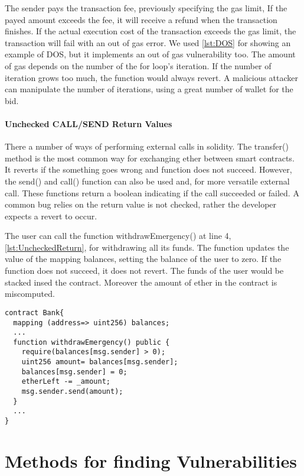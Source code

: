 \documentclass[a4paper,sigconf, language=french,
language=german, language=spanish, language=english]{acmart}
\begin{document}
The sender pays the transaction fee, previously specifying the gas limit, If the payed amount exceeds the fee, it will receive a refund when the transaction finishes. 
If the actual execution cost of the transaction exceeds the gas limit, the transaction will fail with an out of gas error. 
We used \autoref{lst:DOS} for showing an example of DOS, but it implements an out of gas vulnerability too. 
The amount of gas depends on the number of the for loop's iteration. If the number of iteration grows too much, the function would always revert. A malicious attacker can 
manipulate the number of iterations, using a great number of wallet for the bid.

\paragraph{Unchecked CALL/SEND Return Values} There a number of ways of performing external calls in solidity. The transfer() method is the most common way for exchanging ether between smart contracts. 
It reverts if the something goes wrong and function does not succeed. However, the send() and call() function can also be used and, for more versatile external call. 
These functions return a boolean indicating if the call succeeded or failed.  A common bug relies on the return value is not checked, rather the developer expects a revert to occur. 

The user can call the function withdrawEmergency()  at line 4, \autoref{lst:UncheckedReturn}, for withdrawing all its funds. The function updates the value of the mapping balances, setting 
the balance of the user to zero. If the function does not succeed, it does not revert. 
The funds of the user would be stacked insed the contract. Moreover the amount of ether in the contract is miscomputed.


\begin{lstlisting}[language=Solidity,caption={Unchecked CALL/SEND Return Values},label={lst:UncheckedReturn}]
contract Bank{
  mapping (address=> uint256) balances;
  ... 
  function withdrawEmergency() public {
    require(balances[msg.sender] > 0);
    uint256 amount= balances[msg.sender];
    balances[msg.sender] = 0;
    etherLeft -= _amount;
    msg.sender.send(amount);
  }
  ...
}

\end{lstlisting}

\section{Methods for finding Vulnerabilities}
\label{MethodologiesForTools}
\end{document}
